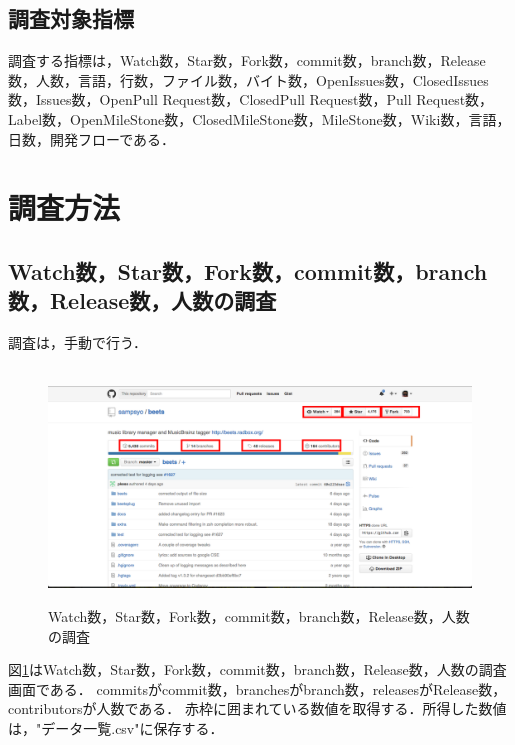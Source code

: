 \subsection{調査対象指標}
調査する指標は，Watch数，Star数，Fork数，commit数，branch数，Release数，人数，言語，行数，ファイル数，バイト数，OpenIssues数，ClosedIssues数，Issues数，OpenPull Request数，ClosedPull Request数，Pull Request数，Label数，OpenMileStone数，ClosedMileStone数，MileStone数，Wiki数，言語，日数，開発フローである．




\section{調査方法}
\subsection{Watch数，Star数，Fork数，commit数，branch数，Release数，人数の調査}
調査は，手動で行う．


\begin{figure}[H]
\centering　
\includegraphics[width=13cm]{Watch.png}
\caption{Watch数，Star数，Fork数，commit数，branch数，Release数，人数の調査}\label{tab:Watch}
\end{figure}
図\ref{tab:Watch}はWatch数，Star数，Fork数，commit数，branch数，Release数，人数の調査画面である．
commitsがcommit数，branchesがbranch数，releasesがRelease数，contributorsが人数である．
赤枠に囲まれている数値を取得する．所得した数値は，"データ一覧.csv"に保存する．




